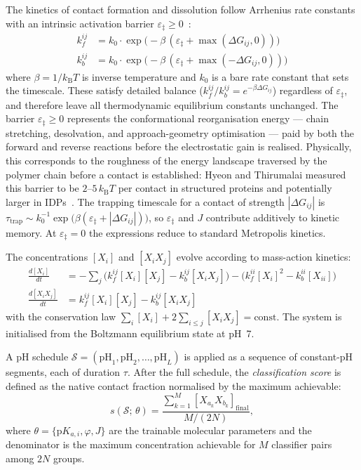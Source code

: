 \documentclass[10pt,twocolumn]{article}
\begin{document}
The kinetics of contact formation and dissolution follow Arrhenius rate constants with an intrinsic activation barrier $\varepsilon_\ddagger \geq 0$~\cite{wilber2007,hyeon2003}:
\begin{align}
  k_f^{ij} &= k_0 \cdot \exp\!\bigl(-\beta\,(\varepsilon_\ddagger + \max(\Delta G_{ij},0))\bigr) \label{eq:kf}\\
  k_b^{ij} &= k_0 \cdot \exp\!\bigl(-\beta\,(\varepsilon_\ddagger + \max(-\Delta G_{ij},0))\bigr) \label{eq:kb}
\end{align}
where $\beta = 1/k_\mathrm{B}T$ is inverse temperature and $k_0$ is a bare rate constant that sets the timescale.
These satisfy detailed balance ($k_f^{ij}/k_b^{ij} = e^{-\beta\Delta G_{ij}}$) regardless of $\varepsilon_\ddagger$, and therefore leave all thermodynamic equilibrium constants unchanged.
The barrier $\varepsilon_\ddagger \geq 0$ represents the conformational reorganisation energy — chain stretching, desolvation, and approach-geometry optimisation — paid by both the forward and reverse reactions before the electrostatic gain is realised.
Physically, this corresponds to the roughness of the energy landscape traversed by the polymer chain before a contact is established: Hyeon and Thirumalai measured this barrier to be $2$--$5\,k_\mathrm{B}T$ per contact in structured proteins and potentially larger in IDPs~\cite{hyeon2003}.
The trapping timescale for a contact of strength $|\Delta G_{ij}|$ is
$\tau_\mathrm{trap} \sim k_0^{-1} \exp\!\bigl(\beta(\varepsilon_\ddagger + |\Delta G_{ij}|)\bigr)$,
so $\varepsilon_\ddagger$ and $J$ contribute additively to kinetic memory.
At $\varepsilon_\ddagger = 0$ the expressions reduce to standard Metropolis kinetics.

The concentrations $[X_i]$ and $[X_iX_j]$ evolve according to mass-action kinetics:
\begin{align}
  \frac{d[X_i]}{dt} &= -\sum_{j}^{} \bigl(k_f^{ij}[X_i][X_j] - k_b^{ij}[X_iX_j]\bigr) - \bigl(k_f^{ii}[X_i]^2 - k_b^{ii}[X_{ii}]\bigr) \nonumber \\
  \frac{d[X_iX_j]}{dt} &= k_f^{ij}[X_i][X_j] - k_b^{ij}[X_iX_j]
  \label{eq:ode}
\end{align}
with the conservation law $\sum_i [X_i] + 2\sum_{i \le j}[X_iX_j] = \mathrm{const}$.
The system is initialised from the Boltzmann equilibrium state at pH~7.

A pH schedule $\mathcal{S} = (\mathrm{pH}_1, \mathrm{pH}_2, \ldots, \mathrm{pH}_L)$ is applied as a sequence of constant-pH segments, each of duration $\tau$.
After the full schedule, the \emph{classification score} is defined as the native contact fraction normalised by the maximum achievable:
\begin{equation}
  s(\mathcal{S};\,\theta) = \frac{\sum_{k=1}^{M}[X_{a_k}X_{b_k}]_\mathrm{final}}{M/(2N)},
  \label{eq:score}
\end{equation}
where $\theta = \{\mathrm{p}K_{a,i}, \varphi, J\}$ are the trainable molecular parameters and the denominator is the maximum concentration achievable for $M$ classifier pairs among $2N$ groups.
\end{document}
